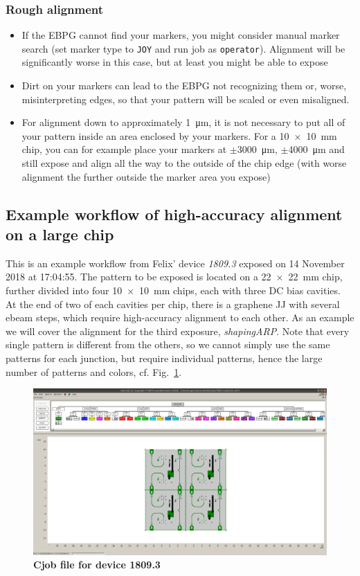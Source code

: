\subsubsection{Rough alignment}
\begin{itemize}
	\item If the EBPG cannot find your markers, you might consider manual marker search (set marker type to \lstinline|JOY| and run job as \lstinline|operator|). 
	Alignment will be significantly worse in this case, but at least you might be able to expose
	\item Dirt on your markers can lead to the EBPG not recognizing them or, worse, misinterpreting edges, so that your pattern will be scaled or even misaligned.
	\item For alignment down to approximately \SI{1}{\micro\meter}, it is not necessary to put all of your pattern inside an area enclosed by your markers. 
	For a \SI{10x10}{\milli\meter} chip, you can for example place your markers at $\pm$\SI{3000}{\micro\meter}, $\pm$\SI{4000}{\micro\meter} and still expose and align all the way to the outside of the chip edge (with worse alignment the further outside the marker area you expose)
\end{itemize}

\subsection{Example workflow of high-accuracy alignment on a large chip}
%
This is an example workflow from Felix' device \textit{1809.3} exposed on 14 November 2018 at 17:04:55.
%
The pattern to be exposed is located on a \SI{22x22}{\milli\meter} chip, further divided into four \SI{10x10}{\milli\meter} chips, each with three DC bias cavities. 
%
At the end of two of each cavities per chip, there is a graphene JJ with several ebeam steps, which require high-accuracy alignment to each other. 
%
As an example we will cover the alignment for the third exposure, \textit{shapingARP}. 
%
Note that every single pattern is different from the others, so we cannot simply use the same patterns for each junction, but require individual patterns, hence the large number of patterns and colors, cf. Fig.~\ref{fig:ebeam1}.

\begin{figure}
	\centering
	\includegraphics[width=\linewidth]{appendix/figs/ebeam1}
	\caption{
	\textbf{Cjob file for device 1809.3}
	}
	\label{fig:ebeam1}
\end{figure}


